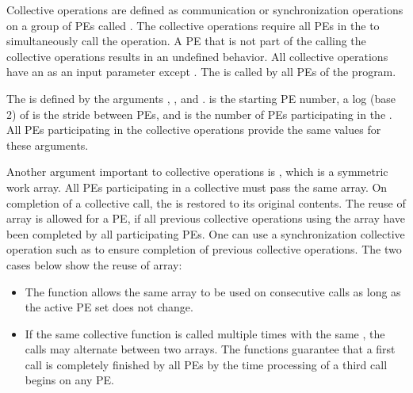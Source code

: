 
Collective operations are defined as communication or synchronization operations 
on a group of \ac{PE}s called \activeset{}. The collective operations require all
\ac{PE}s in the \activeset{} to simultaneously call the operation. 
A \ac{PE} that is not part of the \activeset{} calling the collective 
operations results in an undefined behavior.  All
collective operations have an \activeset{} as an input parameter except \barrierall{}. The \barrierall{} is called by all \ac{PE}s of the \openshmem{} program. 

The \activeset{} is defined by the arguments , , 
and .   is the starting \ac{PE} number, a log (base 2) of  is the stride between \ac{PE}s, and  is the number of \ac{PE}s participating in the \activeset{}.  All \ac{PE}s participating in the 
collective operations provide the same values for these arguments. 
 
Another argument important to collective operations is , which is a symmetric work array.  All \ac{PE}s participating in a collective must pass the same
 array.  On completion of a collective call, the  is restored to its 
original contents.  The reuse of  array is allowed for a \ac{PE}, if all previous collective operations using the  array have been completed by all participating 
\ac{PE}s.  One can use a synchronization collective operation such as \barrier{}
to ensure completion of previous collective operations.  The two cases below
show the reuse of  array:

\begin{itemize}
\item The  function allows the same  array to be 		used on consecutive calls as long as the active \ac{PE} set does not change.
\item  If the same collective function is called multiple times with the
          same \activeset, the calls may alternate between two  arrays.
          The \openshmem functions guarantee that a first call is completely finished by 
          all \ac{PE}s by the time processing of a third  call  begins  on any \ac{PE}.          
\end{itemize}


